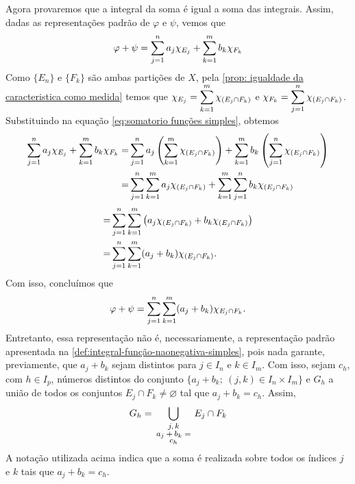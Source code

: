 \begin{prova}
    Agora provaremos que a integral da soma é igual a soma das integrais. 
    Assim, dadas as representações padrão de $\varphi$ e $\psi$, vemos que
    \begin{equation}
    	\label{eq:somatorio funções simples}
    	\varphi +\psi
    	=
    	\displaystyle \sum_{j = 1}^n a_j\chi_{E_j}
    	+
    	\displaystyle \sum_{k = 1}^m b_k\chi_{F_k}
    \end{equation}
    Como $\{E_n\}$ e $\{F_k\}$ são ambas partições de $X$, pela \ref{prop: igualdade da caracteristica como medida} temos que
    $\chi_{E_j} = \displaystyle \sum_{k = 1}^m \chi_{(E_j \cap F_k)}$ e 
    $\chi_{F_k} = \displaystyle \sum_{j = 1}^n \chi_{(E_j \cap F_k)}$.
    Substituindo na equação \ref{eq:somatorio funções simples}, obtemos    
    \begin{align*}
    	\displaystyle \sum_{j = 1}^n a_j\chi_{E_j}
    	+
    	\displaystyle \sum_{k = 1}^m b_k\chi_{F_k}
    	= &
    	\displaystyle \sum_{j = 1}^n a_j\left(\displaystyle \sum_{k = 1}^m \chi_{(E_j \cap F_k)}\right)
    	+
    	\displaystyle \sum_{k = 1}^m b_k\left(\displaystyle \sum_{j = 1}^n \chi_{(E_j \cap F_k)}\right)\\
    	= &
    	\displaystyle \sum_{j = 1}^n\displaystyle \sum_{k = 1}^m a_j\chi_{(E_j \cap F_k)}
    	+
    	\displaystyle \sum_{k = 1}^m \displaystyle \sum_{j = 1}^n b_k\chi_{(E_j \cap F_k)}\\
	\end{align*}
	\begin{align*}
		= &
		\displaystyle \sum_{j = 1}^n\displaystyle \sum_{k = 1}^m 
		\left(a_j\chi_{(E_j \cap F_k)}
		+
		b_k\chi_{(E_j \cap F_k)}\right)\\
		= &
		\displaystyle \sum_{j = 1}^n\displaystyle \sum_{k = 1}^m 
		(a_j + b_k)\chi_{(E_j \cap F_k)}.
	\end{align*}
    Com isso, concluímos que
    $$
    \varphi + \psi = \displaystyle \sum_{j = 1}^n\displaystyle \sum_{k = 1}^m(a_j + b_k)\chi_{E_j \cap F_k}.
    $$
    Entretanto, essa representação não é, necessariamente, a representação padrão apresentada na \ref{def:integral-função-naonegativa-simples}, pois 
    nada garante, previamente, que $a_j + b_k$ sejam distintos para $j \in I_n$ e $k \in I_m$.
    Com isso, sejam $c_h$, com $h \in I_p$, números distintos do conjunto $\{a_j + b_k; \ (j,k) \in I_n \times I_m\}$ e $G_h$ a união de todos os conjuntos $E_j \cap F_k \neq \varnothing$ tal que $a_j + b_k = c_h$.
    Assim, 
    $$
    G_h = \bigcup_{\begin{minipage}{1.4cm}
        \fontsize{8}{5}\selectfont
        \centering
        $j,k$
        $a_j + b_k = c_h$
    \end{minipage}} E_j \cap F_k
    $$
    A notação utilizada acima indica que a soma é realizada sobre todos os índices $j$ e $k$ tais que $a_j + b_k =c_h$.

\end{prova}
